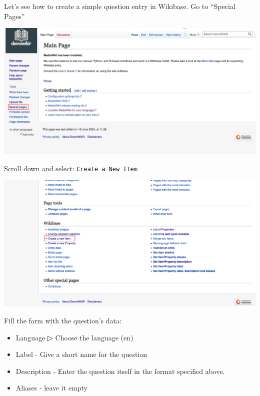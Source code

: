 \documentclass[
  letterpaper,
  DIV=11,
  numbers=noendperiod]{scrreprt}
\begin{document}
Let's see how to create a simple question entry in Wikibase. Go to
``Special Pages''

\begin{center}
\includegraphics{png/question_to_wikibase/wikidata_specialPages_2x1.png}
\end{center}

Scroll down and select: \texttt{Create\ a\ New\ Item}

\begin{center}
\includegraphics{png/question_to_wikibase/wikibase_addNewItem_2x1.png}
\end{center}

Fill the form with the question's data:

\begin{itemize}
\item
  Language ▷ Choose the language (en)
\item
  Label - Give a short name for the question
\item
  Description - Enter the question itself in the format specified above.
\item
  Aliases - leave it empty
\end{itemize}
\end{document}
